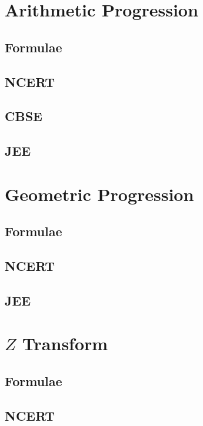 \documentclass[journal]{IEEEtran}
\begin{document}
\tableofcontents

\newpage
\onecolumn


\renewcommand{\thetable}{\theenumi}

\section{Arithmetic Progression}
\subsection{Formulae}

\subsection{NCERT}

\subsection{CBSE}

\subsection{JEE}

\section{Geometric Progression}
\subsection{Formulae}

\subsection{NCERT}

\subsection{JEE}

\section{$Z$ Transform}
\subsection{Formulae}

\subsection{NCERT}

\end{document}
